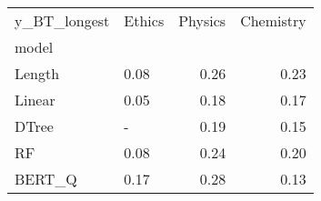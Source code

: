 \begin{tabular}{llrr}
\toprule
y\_BT\_longest & Ethics &  Physics &  Chemistry \\
model  &        &          &            \\
\midrule
Length &   0.08 &     0.26 &       0.23 \\
Linear &   0.05 &     0.18 &       0.17 \\
DTree  &      - &     0.19 &       0.15 \\
RF     &   0.08 &     0.24 &       0.20 \\
BERT\_Q &   0.17 &     0.28 &       0.13 \\
\bottomrule
\end{tabular}
